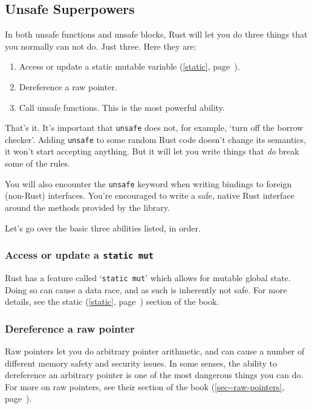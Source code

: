 \documentclass[a4paper,]{book}
\renewcommand*{\hyperlink}[2]{%
 #2 (\autoref{#1}, page~\pageref{#1})}
\providecommand{\tightlist}{%
  \setlength{\itemsep}{0pt}\setlength{\parskip}{0pt}}
\begin{document}
\subsection{Unsafe Superpowers}\label{unsafe-superpowers}

In both unsafe functions and unsafe blocks, Rust will let you do three
things that you normally can not do. Just three. Here they are:

\begin{enumerate}
\def\labelenumi{\arabic{enumi}.}
\tightlist
\item
  Access or update a \protect\hyperlink{static}{static mutable
  variable}.
\item
  Dereference a raw pointer.
\item
  Call unsafe functions. This is the most powerful ability.
\end{enumerate}

That's it. It's important that \texttt{unsafe} does not, for example,
`turn off the borrow checker'. Adding \texttt{unsafe} to some random
Rust code doesn't change its semantics, it won't start accepting
anything. But it will let you write things that \emph{do} break some of
the rules.

You will also encounter the \texttt{unsafe} keyword when writing
bindings to foreign (non-Rust) interfaces. You're encouraged to write a
safe, native Rust interface around the methods provided by the library.

Let's go over the basic three abilities listed, in order.

\subsubsection{\texorpdfstring{Access or update a
\texttt{static\ mut}}{Access or update a static mut}}\label{access-or-update-a-static-mut}

Rust has a feature called `\texttt{static\ mut}' which allows for
mutable global state. Doing so can cause a data race, and as such is
inherently not safe. For more details, see the
\protect\hyperlink{static}{static} section of the book.

\subsubsection{Dereference a raw
pointer}\label{dereference-a-raw-pointer}

Raw pointers let you do arbitrary pointer arithmetic, and can cause a
number of different memory safety and security issues. In some senses,
the ability to dereference an arbitrary pointer is one of the most
dangerous things you can do. For more on raw pointers, see
\protect\hyperlink{sec--raw-pointers}{their section of the book}.
\end{document}

